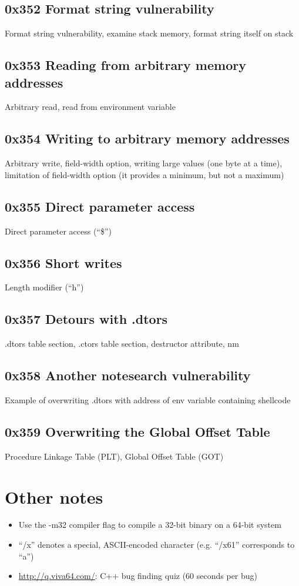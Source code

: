 \documentclass[letterpaper]{article}
\begin{document}
\subsection*{0x352 Format string vulnerability}
Format string vulnerability, examine stack memory, format string itself on stack

\subsection*{0x353 Reading from arbitrary memory addresses}
Arbitrary read, read from environment variable

\subsection*{0x354 Writing to arbitrary memory addresses}
Arbitrary write, field-width option, writing large values (one byte at a time), limitation of field-width option (it provides a minimum, but not a maximum)

\subsection*{0x355 Direct parameter access}
Direct parameter access (``\$'')

\subsection*{0x356 Short writes}
Length modifier (``h'')

\subsection*{0x357 Detours with .dtors}
.dtors table section, .ctors table section, destructor attribute, nm

\subsection*{0x358 Another notesearch vulnerability}
Example of overwriting .dtors with address of env variable containing shellcode

\subsection*{0x359 Overwriting the Global Offset Table}
Procedure Linkage Table (PLT), Global Offset Table (GOT)

\section{Other notes}
\begin{itemize}
\item Use the -m32 compiler flag to compile a 32-bit binary on a 64-bit system
\item ``\slash x''  denotes a special, ASCII-encoded character (e.g. ``\slash x61'' corresponds to ``a'')
\item \href{http://q.viva64.com/}{http://q.viva64.com/}: C++ bug finding quiz (60 seconds per bug)
\end{itemize}
\end{document}
